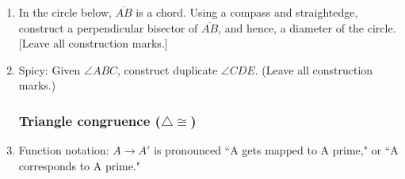\begin{enumerate}
\newpage
    \item In the circle below, $\overline{AB}$ is a chord. Using a compass and straightedge, construct a perpendicular bisector of $\overline{AB}$, and hence, a diameter of the circle. [Leave all construction marks.]\\[4cm]
    \begin{center}
    \end{center}

\newpage
  \item Spicy: Given $\angle ABC$, construct duplicate $\angle CDE$. (Leave all construction marks.)
    \begin{center}
    \end{center}

\newpage
\subsubsection*{Triangle congruence ($\triangle \cong$)}

  \item Function notation: $A \rightarrow A'$ is pronounced ``A gets mapped to A prime," or ``A corresponds to A prime."


\end{enumerate}
